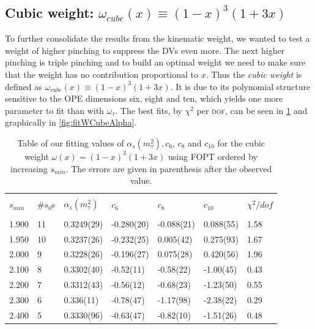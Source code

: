 \documentclass[../../index.tex]{subfiles}
\begin{document}
\subsection{Cubic weight: $\omega_{cube}(x) \equiv (1-x)^3(1+3x)$}
To further consolidate the results from the kinematic weight, we wanted to test
a weight of higher pinching to suppress the \textsc{DV}s even more. The next
higher pinching is triple pinching and to build an optimal weight we need to
make sure that the weight has no contribution proportional to $x$. Thus the
\textit{cubic weight} is defined as $\omega_{cube}(x) \equiv (1-x)^3(1+3x)$. It
is due to its polynomial structure sensitive to the \textsc{OPE} dimensions six,
eight and ten, which yields one more parameter to fit than with $\omega_\tau$.
The best fits, by $\chi^2$ per \textsc{dof}, can be seen in \cref{table:fitWCubicAlD6D8D10} and
graphically in \cref{fig:fitWCubeAlpha}.
\begin{table}

  \centering
  \begin{tabular}{lllllll}
    \toprule \\
    $s_{min}$ & \#$s_0$s & $\alpha_s(m_\tau^2)$ & $c_6$ & $c_8$ & $c_{10}$ & $\chi^2/dof$  \\
    \hline \\
    1.900 & 11 & 0.3249(29) & -0.280(20) & -0.088(21) & 0.088(55) & 1.58 \\
    1.950 & 10 & 0.3237(26) & -0.232(25) & 0.005(42) & 0.275(93) & 1.67 \\
    2.000 & 9 & 0.3228(26) & -0.196(27) & 0.075(28) & 0.420(56) & 1.96 \\
    2.100 & 8 & 0.3302(40) & -0.52(11) & -0.58(22) & -1.00(45) & 0.43 \\
    2.200 & 7 & 0.3312(43) & -0.56(12) & -0.68(23) & -1.23(50) & 0.55 \\
    2.300 & 6 & 0.336(11) & -0.78(47) & -1.17(98) & -2.38(22) & 0.29 \\
    2.400 & 5 & 0.3330(96) & -0.63(47) & -0.82(10) & -1.51(26) & 0.48 \\
    \bottomrule
  \end{tabular}
  \caption{Table of our fitting values of $\alpha_s(m_\tau^2), c_6$, $c_8$ and
    $c_{10}$ for the cubic weight $\omega(x)=(1-x)^3(1+3x)$ using FOPT ordered
    by increasing $s_{min}$. The errors are given in parenthesis after the observed value.}
  \label{table:fitWCubicAlD6D8D10}
\end{table}
\end{document}
